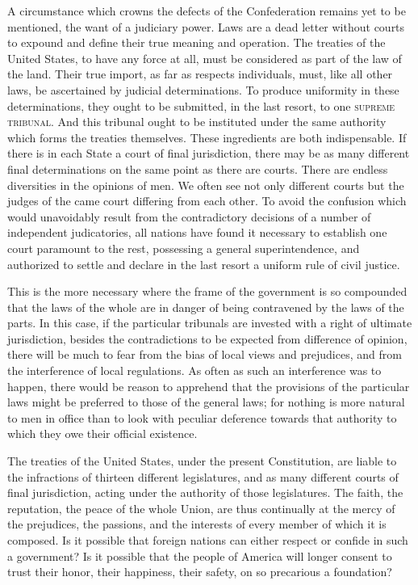 A circumstance which crowns the defects of the Confederation remains yet to be mentioned, the want of a judiciary power. 
Laws are a dead letter without courts to expound and define their true meaning and operation. 
The treaties of the United States, to have any force at all, must be considered as part of the law of the land. 
Their true import, as far as respects individuals, must, like all other laws, be ascertained by judicial determinations. 
To produce uniformity in these determinations, they ought to be submitted, in the last resort, to one \textsc{supreme tribunal}. 
And this tribunal ought to be instituted under the same authority which forms the treaties themselves. 
These ingredients are both indispensable. 
If there is in each State a court of final jurisdiction, there may be as many different final determinations on the same point as there are courts. 
There are endless diversities in the opinions of men. 
We often see not only different courts but the judges of the came court differing from each other. 
To avoid the confusion which would unavoidably result from the contradictory decisions of a number of independent judicatories, all nations have found it necessary to establish one court paramount to the rest, possessing a general superintendence, and authorized to settle and declare in the last resort a uniform rule of civil justice.

This is the more necessary where the frame of the government is so compounded that the laws of the whole are in danger of being contravened by the laws of the parts. 
In this case, if the particular tribunals are invested with a right of ultimate jurisdiction, besides the contradictions to be expected from difference of opinion, there will be much to fear from the bias of local views and prejudices, and from the interference of local regulations. 
As often as such an interference was to happen, there would be reason to apprehend that the provisions of the particular laws might be preferred to those of the general laws; for nothing is more natural to men in office than to look with peculiar deference towards that authority to which they owe their official existence.

The treaties of the United States, under the present Constitution, are liable to the infractions of thirteen different legislatures, and as many different courts of final jurisdiction, acting under the authority of those legislatures. 
The faith, the reputation, the peace of the whole Union, are thus continually at the mercy of the prejudices, the passions, and the interests of every member of which it is composed. 
Is it possible that foreign nations can either respect or confide in such a government? 
Is it possible that the people of America will longer consent to trust their honor, their happiness, their safety, on so precarious a foundation?

